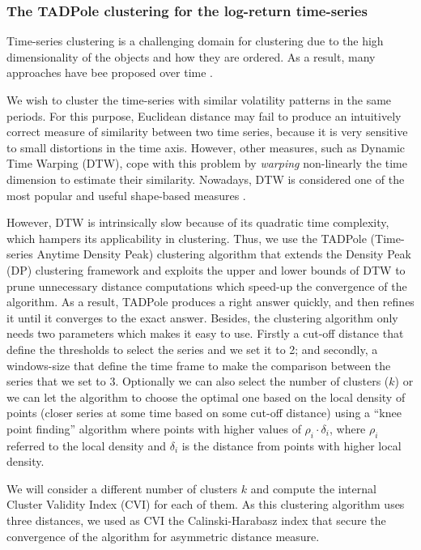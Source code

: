 \documentclass{bmcart}
\begin{document}
\subsubsection*{The TADPole clustering for the log-return time-series}

Time-series clustering is a challenging domain for clustering due to the high dimensionality of the objects and how they are ordered. As a result, many approaches have bee proposed over time \cite{Liao2005Clustering,Rani2012RecentTO, Aghabozorgi2015TSClust}. 

We wish to cluster the time-series with similar volatility patterns in the same periods. For this purpose, Euclidean distance may fail to produce an intuitively correct measure of similarity between  two  time series, because it  is  very sensitive  to  small  distortions in the time  axis. However, other measures, such as Dynamic Time Warping (DTW), cope with this problem by \textit{warping} non-linearly the time dimension to estimate their similarity. Nowadays, DTW is considered one of the most popular and useful shape-based measures \cite{Aghabozorgi2015TSClust}.

However, DTW is intrinsically slow because of its quadratic time complexity, which hampers its applicability in clustering. Thus, we use the TADPole (Time-series Anytime Density Peak) \cite{TADPole2015}  clustering algorithm that extends the Density Peak (DP) clustering framework \cite{Rodriguez1492} and exploits the upper and lower bounds of DTW to prune unnecessary distance computations which speed-up the convergence of the algorithm. As a result, TADPole produces a right answer quickly, and then refines it until it converges to the exact answer. Besides, the clustering algorithm only needs two parameters which makes it easy to use. Firstly a cut-off distance that define the thresholds to select the series and we set it to 2; and secondly,  a windows-size that define the time frame to make the comparison between the series that we set to 3. Optionally we can also  select the number of clusters ($k$) or we can let the algorithm to choose the optimal one based on the local density of points (closer series at some time based on some cut-off distance) using a “knee point finding” algorithm where points with higher values of $\rho_i \cdot \delta_i$, where $\rho_i$ referred to the local density and $\delta_i$ is the distance from points with higher local density.

We will consider a different number of clusters $k$ and compute the internal Cluster Validity Index (CVI) for each of them. As this clustering algorithm uses three distances, we used as CVI the Calinski-Harabasz index that secure the convergence of the algorithm for asymmetric distance measure.
\end{document}
